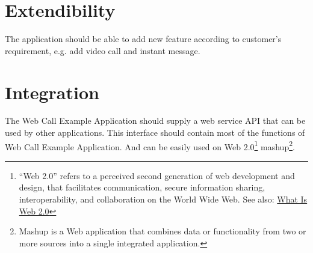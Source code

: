 \section{Extendibility}
\label{sec:Requirement:Extendibility}
The application should be able to add new feature according to customer's requirement, e.g. add video call and instant message.

\section{Integration}
\label{sec:Requirement:Integration}

The Web Call Example Application should supply a web service API that can be used by other applications. This interface should contain most of the functions of Web Call Example Application. And can be easily used on Web 2.0\footnote{``Web 2.0'' refers to a perceived second generation of web development and design, that facilitates communication, secure information sharing, interoperability, and collaboration on the World Wide Web.\cite{Web2dot0} See also: \href{http://www.oreillynet.com/pub/a/oreilly/tim/news/2005/09/30/what-is-web-20.html}{What Is Web 2.0}\cite{WhatIsWeb2dot0}} mashup\footnote{Mashup is a Web application that combines data or functionality from two or more sources into a single integrated application.}.

